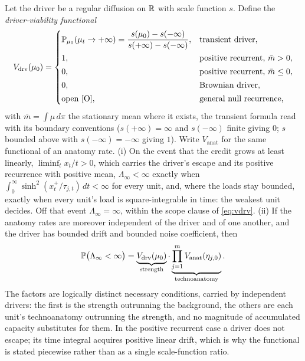 \begin{theorem}\label{thm:twocond}
Let the driver be a regular diffusion on $\mathbb{R}$ with scale function $s$.
Define the \emph{driver-viability functional}
\begin{equation}\label{eq:vdrv}
V_{\mathrm{drv}}(\mu_0)=
\begin{cases}
\mathbb{P}_{\mu_0}(\mu_t\to+\infty)=\dfrac{s(\mu_0)-s(-\infty)}{s(+\infty)-s(-\infty)},
& \text{transient driver,}\\[8pt]
1, & \text{positive recurrent, }\bar m>0,\\[2pt]
0, & \text{positive recurrent, }\bar m\le0,\\[2pt]
0, & \text{Brownian driver,}\\[2pt]
\text{open [O]}, & \text{general null recurrence,}
\end{cases}
\end{equation}
with $\bar m=\int\mu\,d\pi$ the stationary mean where it exists, the
transient formula read with its boundary conventions ($s(+\infty)=\infty$
and $s(-\infty)$ finite giving $0$; $s$ bounded above with
$s(-\infty)=-\infty$ giving $1$).
Write $V_{\mathrm{anat}}$ for the same functional of an anatomy rate.
(i) On the event that the credit grows at least linearly,
$\liminf_tx_t/t>0$, which carries the driver's escape and its positive
recurrence with positive mean, $\Lambda_\infty<\infty$ exactly when
$\int_0^\infty\sinh^2(x_t^+/\tau_{j,t})\,dt<\infty$ for every unit, and,
where the loads stay bounded, exactly when every unit's load is
square-integrable in time: the weakest unit decides. Off that event
$\Lambda_\infty=\infty$, within the scope clause of \eqref{eq:vdrv}. (ii)
If the anatomy rates are moreover independent of the driver and of one
another, and the driver has bounded drift and bounded noise coefficient,
then
\begin{equation}\label{eq:twocond}
\mathbb{P}\bigl(\Lambda_\infty<\infty\bigr)
=\underbrace{V_{\mathrm{drv}}(\mu_0)}_{\text{strength}}
\cdot
\underbrace{\prod_{j=1}^mV_{\mathrm{anat}}(\eta_{j,0})}_{\text{technoanatomy}}.
\end{equation}
The factors are logically distinct necessary conditions, carried by
independent drivers: the first is the strength outrunning the background,
the others are each unit's technoanatomy outrunning the strength, and no
magnitude of accumulated capacity substitutes for them. In the positive
recurrent case a driver does not escape; its time integral acquires
positive linear drift, which is why the functional is stated piecewise
rather than as a single scale-function ratio.
\end{theorem}

